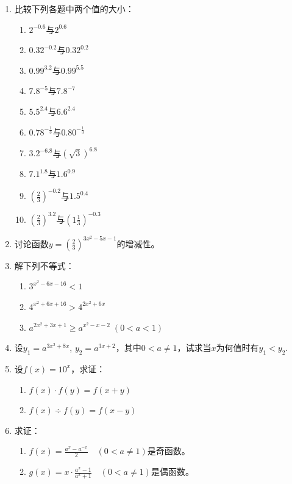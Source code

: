\begin{enumerate}
 \item 比较下列各题中两个值的大小：
 \begin{multicols}{2}
 \begin{enumerate}[(1)]
     \item $2^{-0.6}$与$2^{0.6}$
     \item $0.32^{-0.2}$与$0.32^{0.2}$
     \item $0.99^{3.2}$与$0.99^{5.5}$
     \item $7.8^{-5}$与$7.8^{-7}$
     \item $5.5^{2.4}$与$6.6^{2.4}$
     \item $0.78^{-\tfrac{1}{3}}$与$0.80^{-\tfrac{1}{3}}$
     \item $3.2^{-6.8}$与$\left(\sqrt{3}\right)^{6.8}$
     \item $7.1^{1.8}$与$1.6^{0.9}$
     \item $\left(\frac{2}{3}\right)^{-0.2}$与$1.5^{0.4}$
     \item $\left(\frac{2}{3}\right)^{3.2}$与$\left(1\frac{1}{3}\right)^{-0.3}$
 \end{enumerate}
 \end{multicols}
 
 \item 讨论函数$y=\left(\frac{2}{3}\right)^{3x^2-5x-1}$的增减性。
 \item 解下列不等式：
 \begin{enumerate}[(1)]
     \item $3^{x^2-6x-16}<1$
     \item $4^{x^2+6x+16}>4^{2x^2+6x}$
     \item $a^{2x^2+3x+1}\ge a^{x^2-x-2}\; (0<a<1)$
 \end{enumerate}
 
 \item 设$y_1=a^{3x^2+8x}$, $y_2=a^{3x+2}$，其中$0<a\ne 1$，试求当$x$为何值时有$y_1<y_2$.
 \item 设$f(x)=10^x$，求证：
 \begin{multicols}{2}
 \begin{enumerate}[(1)]
     \item $f(x)\cdot f(y)=f(x+y)$
     \item $f(x)\div f(y)=f(x-y)$
 \end{enumerate}
 \end{multicols}
 
 \item 求证：
 \begin{enumerate}[(1)]
     \item $f(x)=\frac{a^x-a^{-x}}{2}\quad (0<a\ne 1)$是奇函数。
     \item $g(x)=x\cdot \frac{a^x-1}{a^x+1}\quad (0<a\ne 1)$是偶函数。
 \end{enumerate}
 \end{enumerate}
 
